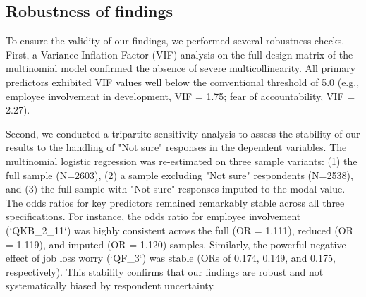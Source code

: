 \documentclass[]{article}
\begin{document}
\subsection{Robustness of findings}
To ensure the validity of our findings, we performed several robustness checks. First, a Variance Inflation Factor (VIF) analysis on the full design matrix of the multinomial model confirmed the absence of severe multicollinearity. All primary predictors exhibited VIF values well below the conventional threshold of 5.0 (e.g., employee involvement in development, VIF = 1.75; fear of accountability, VIF = 2.27).

Second, we conducted a tripartite sensitivity analysis to assess the stability of our results to the handling of "Not sure" responses in the dependent variables. The multinomial logistic regression was re-estimated on three sample variants: (1) the full sample (N=2603), (2) a sample excluding "Not sure" respondents (N=2538), and (3) the full sample with "Not sure" responses imputed to the modal value. The odds ratios for key predictors remained remarkably stable across all three specifications. For instance, the odds ratio for employee involvement (`QKB\_2\_11`) was highly consistent across the full (OR = 1.111), reduced (OR = 1.119), and imputed (OR = 1.120) samples. Similarly, the powerful negative effect of job loss worry (`QF\_3`) was stable (ORs of 0.174, 0.149, and 0.175, respectively). This stability confirms that our findings are robust and not systematically biased by respondent uncertainty.
\end{document}
